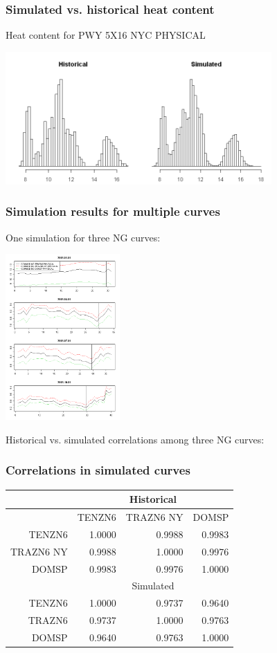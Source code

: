 \documentclass[10pt]{beamer}
\begin{document}
\frame
{
  \frametitle{Simulated vs. historical heat content}
Heat content for PWY 5X16 NYC PHYSICAL
\begin{center}
  \includegraphics[height=2.0in]{figures/heatcontent.png}
\end{center}


}

\frame
{
  \frametitle{Simulation results for multiple curves}
One simulation for three NG curves:
\begin{center}
  \includegraphics[height=2.5in]{figures/ng-multicurve.png}
\end{center}


}

\frame
{
Historical vs. simulated correlations among three NG curves:
  \frametitle{Correlations in simulated curves}
\begin{table}[htbp]
\begin{center}
\begin{tabular}{rrrr}
  \hline
 &  \multicolumn{3}{c}{Historical}  \\ \hline
 & TENZN6  & TRAZN6 NY  & DOMSP    \\
  \hline
TENZN6  & 1.0000 & 0.9988 & 0.9983  \\
  TRAZN6 NY  & 0.9988 & 1.0000 & 0.9976  \\
  DOMSP  & 0.9983 & 0.9976 & 1.0000  \\
   \hline \hline
   &  \multicolumn{3}{c}{Simulated} \\ \hline
   TENZN6  & 1.0000 & 0.9737 & 0.9640 \\
   TRAZN6 & 0.9737 & 1.0000 & 0.9763 \\
   DOMSP & 0.9640 & 0.9763 & 1.0000 \\
   \hline
\end{tabular}
\end{center}
\label{tbl-ng-cor}
\end{table}
}
\end{document}
